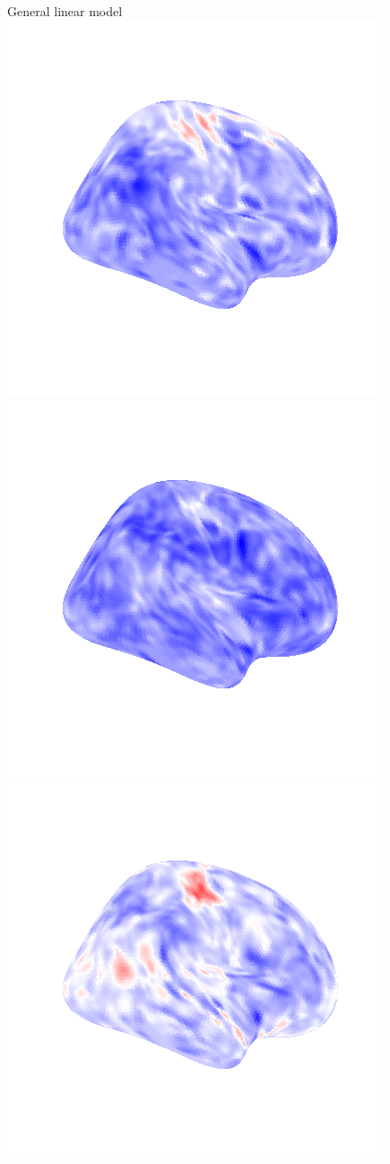 \documentclass[bigger]{beamer}
\begin{document}
\begin{frame}{General linear model}
  \includegraphics[scale=0.20]{python/lr_button_6.png}
  \includegraphics[scale=0.20]{python/lr_button_7.png}
  \includegraphics[scale=0.20]{python/lr_button_8.png}

\end{frame}
\end{document}
